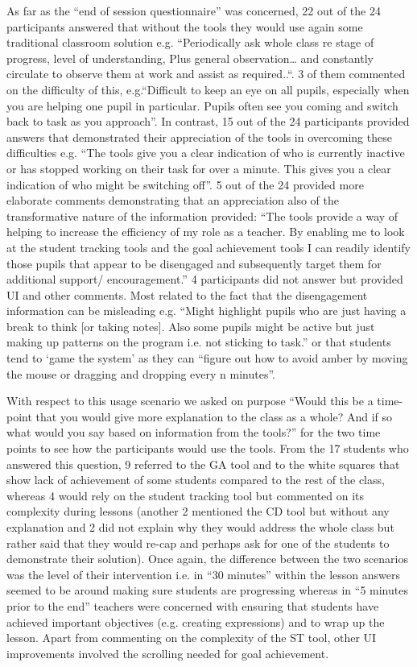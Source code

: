 {{{As far as the “end of session questionnaire” was concerned, 22 out of
the 24 participants answered that without the tools they would use
again some traditional classroom solution e.g. “Periodically ask whole
class re stage of progress, level of understanding, Plus general
observation… and constantly circulate to observe them at work and
assist as required..“. 3 of them commented on the difficulty of this,
e.g.“Difficult to keep an eye on all pupils, especially when you are
helping one pupil in particular. Pupils often see you coming and
switch back to task as you approach”. In contrast, 15 out of the 24
participants provided answers that demonstrated their appreciation of
the tools in overcoming these difficulties e.g. “The tools give you a
clear indication of who is currently inactive or has stopped working
on their task for over a minute. This gives you a clear indication of
who might be switching off”. 5 out of the 24 provided more elaborate
comments demonstrating that an appreciation also of the transformative
nature of the information provided: “The tools provide a way of
helping to increase the efficiency of my role as a teacher. By
enabling me to look at the student tracking tools and the goal
achievement tools I can readily identify those pupils that appear to
be disengaged and subsequently target them for additional support/
encouragement.” 4 participants did not answer but provided UI and
other comments. Most related to the fact that the disengagement
information can be misleading e.g. “Might highlight pupils who are
just having a break to think [or taking notes]. Also some pupils might
be active but just making up patterns on the program i.e. not sticking
to task.” or that students tend to ‘game the system’ as they can “figure out how to avoid amber by moving the mouse or dragging and dropping every n minutes”.  

With respect to this usage scenario we asked on purpose “Would this be
a time-point that you would give more explanation to the class as a
whole? And if so what would you say based on information from the
tools?” for the two time points to see how the participants would use
the tools. From the 17 students who answered this question, 9 referred
to the GA tool and to the white squares that show lack of achievement
of some students compared to the rest of the class, whereas 4 would
rely on the student tracking tool but commented on its complexity
during lessons (another 2 mentioned the CD tool but without any
explanation and 2 did not explain why they would address the whole
class but rather said that they would re-cap and perhaps ask for one
of the students to demonstrate their solution).  Once again, the
difference between the two scenarios was the level of their
intervention i.e. in “30 minutes” within the lesson answers seemed to
be around making sure students are progressing whereas in “5 minutes
prior to the end” teachers were concerned with ensuring that students
have achieved important objectives (e.g. creating expressions) and to
wrap up the lesson. Apart from commenting on the complexity of the ST
tool, other UI improvements involved the scrolling needed for goal
achievement. 

}}}
